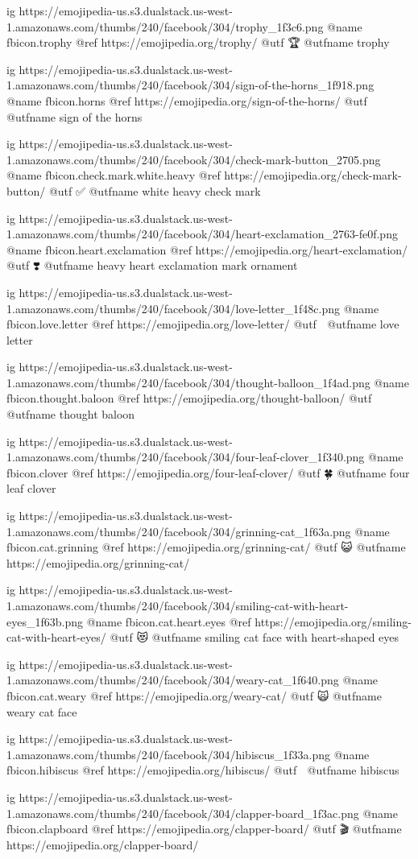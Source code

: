	ig https://emojipedia-us.s3.dualstack.us-west-1.amazonaws.com/thumbs/240/facebook/304/trophy_1f3c6.png
	@name fbicon.trophy
	@ref https://emojipedia.org/trophy/
	@utf 🏆
	@utfname trophy

	ig https://emojipedia-us.s3.dualstack.us-west-1.amazonaws.com/thumbs/240/facebook/304/sign-of-the-horns_1f918.png
	@name fbicon.horns
	@ref https://emojipedia.org/sign-of-the-horns/
	@utf 🤘
	@utfname sign of the horns

	ig https://emojipedia-us.s3.dualstack.us-west-1.amazonaws.com/thumbs/240/facebook/304/check-mark-button_2705.png
	@name fbicon.check.mark.white.heavy
	@ref https://emojipedia.org/check-mark-button/
	@utf ✅
	@utfname white heavy check mark

	ig https://emojipedia-us.s3.dualstack.us-west-1.amazonaws.com/thumbs/240/facebook/304/heart-exclamation_2763-fe0f.png
	@name fbicon.heart.exclamation
	@ref https://emojipedia.org/heart-exclamation/
	@utf ❣️
	@utfname heavy heart exclamation mark ornament

	ig https://emojipedia-us.s3.dualstack.us-west-1.amazonaws.com/thumbs/240/facebook/304/love-letter_1f48c.png
	@name fbicon.love.letter
	@ref https://emojipedia.org/love-letter/
	@utf 💌
	@utfname love letter

	ig https://emojipedia-us.s3.dualstack.us-west-1.amazonaws.com/thumbs/240/facebook/304/thought-balloon_1f4ad.png
	@name fbicon.thought.baloon
	@ref https://emojipedia.org/thought-balloon/
	@utf 💭
	@utfname thought baloon

	ig https://emojipedia-us.s3.dualstack.us-west-1.amazonaws.com/thumbs/240/facebook/304/four-leaf-clover_1f340.png
	@name fbicon.clover
	@ref https://emojipedia.org/four-leaf-clover/
	@utf 🍀
	@utfname four leaf clover

	ig https://emojipedia-us.s3.dualstack.us-west-1.amazonaws.com/thumbs/240/facebook/304/grinning-cat_1f63a.png
	@name fbicon.cat.grinning
	@ref https://emojipedia.org/grinning-cat/
	@utf 😺
	@utfname https://emojipedia.org/grinning-cat/

	ig https://emojipedia-us.s3.dualstack.us-west-1.amazonaws.com/thumbs/240/facebook/304/smiling-cat-with-heart-eyes_1f63b.png
	@name fbicon.cat.heart.eyes
	@ref https://emojipedia.org/smiling-cat-with-heart-eyes/
	@utf 😻
	@utfname smiling cat face with heart-shaped eyes

	ig https://emojipedia-us.s3.dualstack.us-west-1.amazonaws.com/thumbs/240/facebook/304/weary-cat_1f640.png
	@name fbicon.cat.weary
	@ref https://emojipedia.org/weary-cat/
	@utf 🙀
	@utfname weary cat face

	ig https://emojipedia-us.s3.dualstack.us-west-1.amazonaws.com/thumbs/240/facebook/304/hibiscus_1f33a.png
	@name fbicon.hibiscus
	@ref https://emojipedia.org/hibiscus/
	@utf 🌺
	@utfname hibiscus

	ig https://emojipedia-us.s3.dualstack.us-west-1.amazonaws.com/thumbs/240/facebook/304/clapper-board_1f3ac.png
	@name fbicon.clapboard
	@ref https://emojipedia.org/clapper-board/
	@utf 🎬
	@utfname https://emojipedia.org/clapper-board/

\fi


